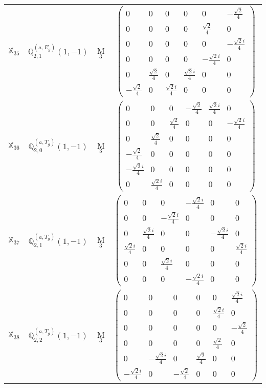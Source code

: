 \documentclass[fleqn,10pt,landscape]{article}
\begin{document}
\begin{itemize}
\begin{center}
\begin{longtable}{c|c|c|c}
$ \mathbb{X}_{35} $ & $\mathbb{Q}_{2,1}^{(a,E_{g})}(1,-1)$ & M$_{3}$ & $\begin{pmatrix} 0 & 0 & 0 & 0 & 0 & - \frac{\sqrt{2}}{4} \\ 0 & 0 & 0 & 0 & \frac{\sqrt{2}}{4} & 0 \\ 0 & 0 & 0 & 0 & 0 & - \frac{\sqrt{2} i}{4} \\ 0 & 0 & 0 & 0 & - \frac{\sqrt{2} i}{4} & 0 \\ 0 & \frac{\sqrt{2}}{4} & 0 & \frac{\sqrt{2} i}{4} & 0 & 0 \\ - \frac{\sqrt{2}}{4} & 0 & \frac{\sqrt{2} i}{4} & 0 & 0 & 0 \end{pmatrix}$ \\
$ \mathbb{X}_{36} $ & $\mathbb{Q}_{2,0}^{(a,T_{g})}(1,-1)$ & M$_{3}$ & $\begin{pmatrix} 0 & 0 & 0 & - \frac{\sqrt{2}}{4} & \frac{\sqrt{2} i}{4} & 0 \\ 0 & 0 & \frac{\sqrt{2}}{4} & 0 & 0 & - \frac{\sqrt{2} i}{4} \\ 0 & \frac{\sqrt{2}}{4} & 0 & 0 & 0 & 0 \\ - \frac{\sqrt{2}}{4} & 0 & 0 & 0 & 0 & 0 \\ - \frac{\sqrt{2} i}{4} & 0 & 0 & 0 & 0 & 0 \\ 0 & \frac{\sqrt{2} i}{4} & 0 & 0 & 0 & 0 \end{pmatrix}$ \\
$ \mathbb{X}_{37} $ & $\mathbb{Q}_{2,1}^{(a,T_{g})}(1,-1)$ & M$_{3}$ & $\begin{pmatrix} 0 & 0 & 0 & - \frac{\sqrt{2} i}{4} & 0 & 0 \\ 0 & 0 & - \frac{\sqrt{2} i}{4} & 0 & 0 & 0 \\ 0 & \frac{\sqrt{2} i}{4} & 0 & 0 & - \frac{\sqrt{2} i}{4} & 0 \\ \frac{\sqrt{2} i}{4} & 0 & 0 & 0 & 0 & \frac{\sqrt{2} i}{4} \\ 0 & 0 & \frac{\sqrt{2} i}{4} & 0 & 0 & 0 \\ 0 & 0 & 0 & - \frac{\sqrt{2} i}{4} & 0 & 0 \end{pmatrix}$ \\
$ \mathbb{X}_{38} $ & $\mathbb{Q}_{2,2}^{(a,T_{g})}(1,-1)$ & M$_{3}$ & $\begin{pmatrix} 0 & 0 & 0 & 0 & 0 & \frac{\sqrt{2} i}{4} \\ 0 & 0 & 0 & 0 & \frac{\sqrt{2} i}{4} & 0 \\ 0 & 0 & 0 & 0 & 0 & - \frac{\sqrt{2}}{4} \\ 0 & 0 & 0 & 0 & \frac{\sqrt{2}}{4} & 0 \\ 0 & - \frac{\sqrt{2} i}{4} & 0 & \frac{\sqrt{2}}{4} & 0 & 0 \\ - \frac{\sqrt{2} i}{4} & 0 & - \frac{\sqrt{2}}{4} & 0 & 0 & 0 \end{pmatrix}$ \\

\end{longtable}
\end{center}
\end{itemize}
\end{document}
